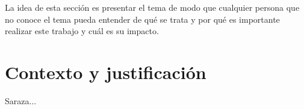 La idea de esta sección es presentar el tema de modo que cualquier persona que no conoce el tema pueda entender de qué se trata y por qué es importante realizar este trabajo y cuál es su impacto.
\section{Contexto y justificación}
\label{sec:contextoYJustificacion}

Saraza...
